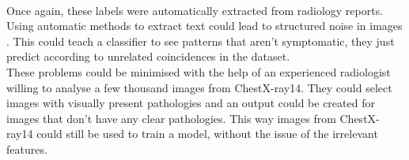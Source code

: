 \\
Once again, these labels were automatically extracted from radiology reports. Using automatic methods to extract text could lead to structured noise in images \cite{16}. This could teach a classifier to see patterns that aren’t symptomatic, they just predict according to unrelated coincidences in the dataset.\newline
\\
These problems could be minimised with the help of an experienced radiologist willing to analyse a few thousand images from ChestX-ray14. They could select images with visually present pathologies and an output could be created for images that don’t have any clear pathologies.  This way images from ChestX-ray14 could still be used to train a model, without the issue of the irrelevant features.







